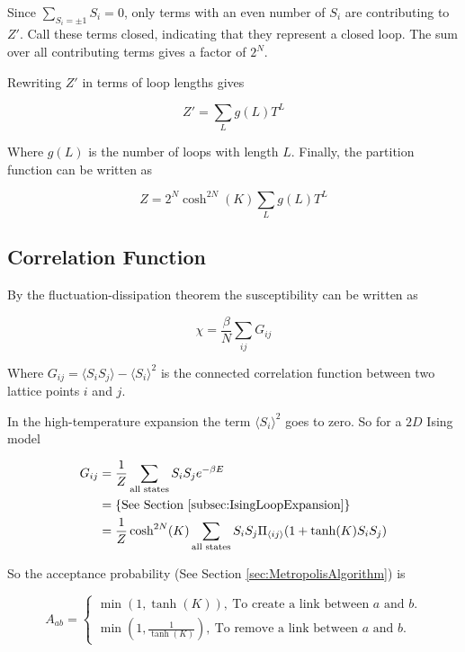 Since $\sum_{S_i = \pm 1} S_i = 0$, only terms with an even number of $S_i$ are contributing to $Z'$. Call these terms closed, indicating that they represent a closed loop. The sum over all contributing terms gives a factor of $2^N$.

Rewriting $Z'$ in terms of loop lengths gives

\begin{equation}
    Z' = \sum_L g(L) T^L
\end{equation}

Where $g(L)$ is the number of loops with length $L$. Finally, the partition function can be written as

\begin{equation}
    Z = 2^N \cosh^{2N} (K) \sum_L g(L) T^L
\end{equation}

\subsection{Correlation Function}
\label{subsec:CorrelationFunction}

By the fluctuation-dissipation theorem the susceptibility can be written as \cite{Chaikin:PrincCondencedMatterPhysics}

\begin{equation}
    \chi = \frac{\beta}{N} \sum_{ij} G_{ij}
\end{equation}

Where $G_{ij} = \langle S_i S_j \rangle - \langle S_i \rangle^2$ is the connected correlation function between two lattice points $i$ and $j$.

In the high-temperature expansion the term $\langle S_i \rangle^2$ goes to zero. So for a $2D$ Ising model

\begin{align}
    G_{ij} &= \frac{1}{Z} \sum_{\text{all states}} S_i S_j e^{-\beta E} \\
    &= \left \{ \text{See Section \ref{subsec:IsingLoopExpansion}} \right \} \\
    &= \frac{1}{Z} \cosh^{2N} (K) \sum_{\text{all states}} S_i S_j \Pi_{\langle ij \rangle} (1 + \tanh(K) S_i S_j)
\end{align}

So the acceptance probability (See Section \ref{sec:MetropolisAlgorithm}) is \cite{Walter:IntroToMC}

\begin{equation}
A_{ab} = \left\{
\begin{array}{ll}
      \min \left (1, \tanh(K)\right), \ \text{To create a link between $a$ and $b$.} \\
      \min \left (1, \frac{1}{\tanh(K)} \right), \ \text{To remove a link between $a$ and $b$.}
\end{array} 
\right. 
\end{equation}



